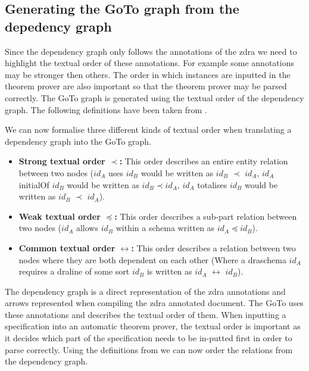 \subsection{Generating the GoTo graph from the depedency graph}

Since the dependency graph only follows the annotations of the \gls{zdra} we need to highlight the textual order of these annotations. For example some annotations may be stronger then others. The order in which instances are inputted in the theorem prover are also important so that the theorem prover may be parsed correctly. The GoTo graph is generated using the textual order of the dependency graph. The following definitions have been taken from \cite{zengfirstyear}.

\begin{defin}
We can now formalise three different kinds of textual order when translating a dependency graph into the GoTo graph.

\begin{itemize}
\item \textbf{Strong textual order $\prec$:} This order describes an entire entity relation between two nodes ($id_{A}$ uses $id_{B}$ would be written as $id_{B}$ $\prec$ $id_{A}$, $id_{A}$ initialOf $id_{B}$ would be written as $id_{B} \prec id_{A}$, $id_{A}$ totalises $id_{B}$ would be written as $id_{B}$ $\prec$ $id_{A}$).

\item \textbf{Weak textual order $\preceq$:} This order describes a sub-part relation between two nodes ($id_{A}$ allows $id_{B}$ within a schema written as $id_{A} \preceq id_{B}$).

\item \textbf{Common textual order $\leftrightarrow$:} This order describes a relation between two nodes where they are both dependent on each other (Where a draschema $id_{A}$ requires a draline of some sort $id_{B}$ is written as $id_{A}$ $\leftrightarrow$ $id_{B}$).
\end{itemize}
\end{defin}

The dependency graph is a direct representation of the \gls{zdra} annotations and arrows represented when compiling the \gls{zdra} annotated document. The GoTo uses these annotations and describes the textual order of them. When inputting a specification into an automatic theorem prover, the textual order is important as it decides which part of the specification needs to be in-putted first in order to parse correctly. Using the definitions from \cite{zengfirstyear} we can now order the relations from the dependency graph.

